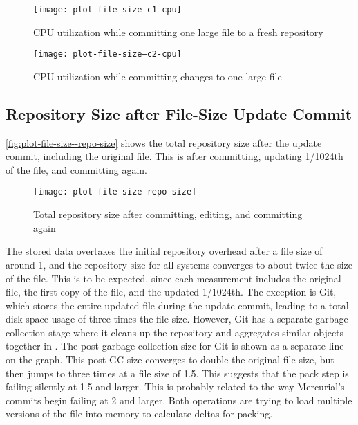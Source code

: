 \begin{figure}[]
  \caption{CPU utilization while committing one large file to a fresh repository}
  \label{fig:plot-file-size--c1-cpu}
  \centering
    \texttt{[image: plot-file-size--c1-cpu]}
\end{figure}


\begin{figure}[]
  \caption{CPU utilization while committing changes to one large file}
  \label{fig:plot-file-size--c2-cpu}
  \centering
    \texttt{[image: plot-file-size--c2-cpu]}
\end{figure}

%


\subsection{Repository Size after File-Size Update Commit}

\autoref{fig:plot-file-size--repo-size} shows the total repository size after
the update \gls{commit}, including the original file. This is after committing,
updating \num{1/1024}th of the file, and committing again.

\begin{figure}[]
  \caption{Total repository size after committing, editing, and committing again}
  \label{fig:plot-file-size--repo-size}
  \centering
    \texttt{[image: plot-file-size--repo-size]}
\end{figure}

The stored data overtakes the initial repository overhead after a file size of
around \SI{1}{\mib}, and the repository size for all systems converges to about
twice the size of the file. This is to be expected, since each measurement
includes the original file, the first copy of the file, and the updated
\num{1/1024}th. The exception is Git, which stores the entire updated file
during the update \gls{commit}, leading to a total disk space usage of three
times the file size. However, Git has a separate garbage collection stage where
it cleans up the repository and aggregates similar objects together in
. The post-garbage collection size for Git is shown as a
separate line on the graph. This post-GC size converges to double the original
file size, but then jumps to three times at a file size of \SI{1.5}{\gib}. This
suggests that the pack step is failing silently at \SI{1.5}{\gib} and larger.
This is probably related to the way Mercurial's \glspl{commit} begin failing at
\SI{2}{\gib} and larger. Both operations are trying to load multiple versions of
the file into memory to calculate deltas for packing.

